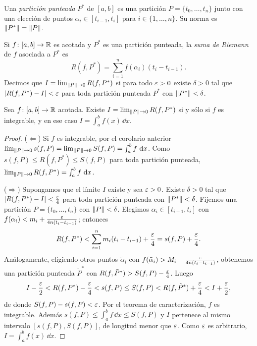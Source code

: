 \begin{definition}
  Una \emph{partición punteada} \(P^{*}\) de \([a, b]\) es una partición \(P = \{ t_0, \dots, t_n \}\) junto con una elección de puntos \(\alpha_i \in [t_{i-1}, t_i]\) para \(i \in \{1, \dots, n\}\). Su norma es \(\left\lVert P^{*} \right\rVert = \left\lVert P \right\rVert\).
\end{definition}

\begin{definition}
  Si \(f\colon [a, b] \to \mathbb{R}\) es acotada y \(P^{*}\) es una partición punteada, la \emph{suma de Riemann} de \(f\) asociada a \(P^{*}\) es
  \[
    R(f, P^{*}) = \sum_{i=1}^{n} f(\alpha_i)(t_i - t_{i-1}).
  \]
  Decimos que \(I = \lim_{\left\lVert P \right\rVert \to 0} R(f, P^{*})\) si para todo \(\varepsilon > 0\) existe \(\delta > 0\) tal que \(|R(f, P^{*}) - I| < \varepsilon\) para toda partición punteada \(P^{*}\) con \(\left\lVert P^{*} \right\rVert < \delta\).
\end{definition}

\begin{theorem}
  Sea \(f\colon [a, b] \to \mathbb{R}\) acotada. Existe \(I = \lim_{\left\lVert P \right\rVert \to 0} R(f, P^{*})\) si y sólo si \(f\) es integrable, y en ese caso \(I = \int_a^b f(x) \,\dd x\).
\end{theorem}

\begin{proof}
  (\(\Leftarrow\)) Si \(f\) es integrable, por el corolario anterior \(\lim_{\left\lVert P \right\rVert \to 0} s(f, P) = \lim_{\left\lVert P \right\rVert \to 0} S(f, P) = \int_a^b f \,\mathop{}\!\mathrm{d} x\). Como \(s(f, P) \leq R(f, P^{*}) \leq S(f, P)\) para toda partición punteada, \(\lim_{\left\lVert P \right\rVert \to 0} R(f, P^{*}) = \int_a^b f \,\mathop{}\!\mathrm{d} x\).

  (\(\Rightarrow\)) Supongamos que el límite \(I\) existe y sea \(\varepsilon > 0\). Existe \(\delta > 0\) tal que \(|R(f, P^{*}) - I| < \frac{\varepsilon}{4}\) para toda partición punteada con \(\left\lVert P^{*} \right\rVert < \delta\). Fijemos una partición \(P = \{ t_0, \dots, t_n \}\) con \(\left\lVert P \right\rVert < \delta\). Elegimos \(\alpha_i \in [t_{i-1}, t_i]\) con \(f(\alpha_i) < m_i + \frac{\varepsilon}{4n(t_i - t_{i-1})}\); entonces
  \[
    R(f, P^{*}) < \sum_{i=1}^{n} m_i (t_i - t_{i-1}) + \frac{\varepsilon}{4} = s(f, P) + \frac{\varepsilon}{4}.
  \]
  Análogamente, eligiendo otros puntos \(\tilde{\alpha}_i\) con \(f(\tilde{\alpha}_i) > M_i - \frac{\varepsilon}{4n(t_i - t_{i-1})}\), obtenemos una partición punteada \(\tilde{P}^{*}\) con \(R(f, \tilde{P}^{*}) > S(f, P) - \frac{\varepsilon}{4}\). Luego
  \[
    I - \frac{\varepsilon}{2} < R(f, P^{*}) - \frac{\varepsilon}{4} < s(f, P) \leq S(f, P) < R(f, \tilde{P}^{*}) + \frac{\varepsilon}{4} < I + \frac{\varepsilon}{2},
  \]
  de donde \(S(f, P) - s(f, P) < \varepsilon\). Por el teorema de caracterización, \(f\) es integrable. Además \(s(f, P) \leq \int_a^b f \,\dd x \leq S(f, P)\) y \(I\) pertenece al mismo intervalo \([s(f, P), S(f, P)]\), de longitud menor que \(\varepsilon\). Como \(\varepsilon\) es arbitrario, \(I = \int_a^b f(x) \,\dd x\).
\end{proof}

